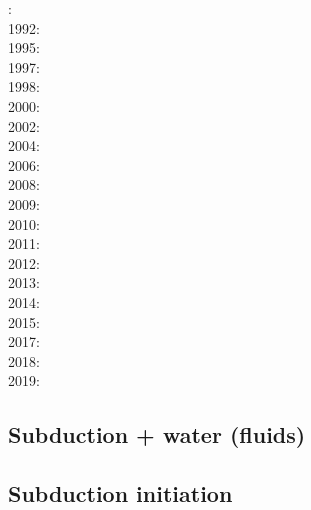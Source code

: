 : \cite{futo85}\\
1992: \cite{wosp92}\\
1995: \cite{yowo95}\cite{voda95}\\
1997: \cite{wowo97}\\
1998: \cite{desw98}\cite{caws98}\\
2000: \cite{wosp00}\\
2002: \cite{bugw02}\\
2004: \cite{geym04}\\
2006: \cite{fabm06}\\
2008: \cite{zlfd08}\\
2009: \cite{anbi09}\cite{bubi09}\\
2010: \cite{bubi10}\cite{bagc10}\\
2011: \cite{dugm11}\cite{vaal11}\\
2012: \cite{dugk12}\cite{dusg12}\\
2013: \cite{care13}\cite{mafv13}\cite{ghbu13}\cite{duge13}\\
2014: \cite{dugs14}\cite{besr14}\cite{vosd14}\\
2015: \cite{vosc15}\\
2017: \cite{frbm17}\\
2018: \cite{garm18}\\
2019: \cite{beml19}

\subsection*{Subduction + water (fluids)}

\cite{geme11}
\cite{fagm12}
\cite{qubu14}
\cite{ceww17}
\cite{ceww19}

\subsection*{Subduction initiation}

